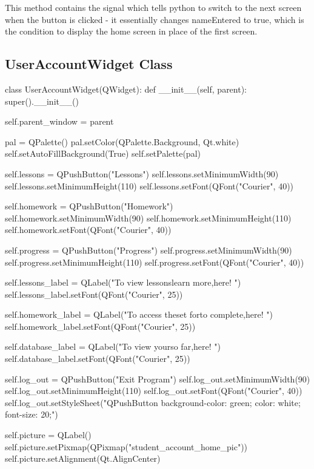 This method contains the signal which tells python to switch to the next screen when the button is clicked - it essentially changes nameEntered to true, which is the condition to display the home screen in place of the first screen.

\subsection{UserAccountWidget Class}

\begin{python}
class UserAccountWidget(QWidget):
    def __init__(self, parent):
        super().__init__()
        
        self.parent_window = parent

        pal = QPalette()
        pal.setColor(QPalette.Background, Qt.white)
        self.setAutoFillBackground(True)
        self.setPalette(pal)

        self.lessons = QPushButton("Lessons")
        self.lessons.setMinimumWidth(90)
        self.lessons.setMinimumHeight(110)
        self.lessons.setFont(QFont("Courier", 40))

        self.homework = QPushButton("Homework")
        self.homework.setMinimumWidth(90)
        self.homework.setMinimumHeight(110)
        self.homework.setFont(QFont("Courier", 40))

        self.progress = QPushButton("Progress")
        self.progress.setMinimumWidth(90)
        self.progress.setMinimumHeight(110)
        self.progress.setFont(QFont("Courier", 40))
        
        self.lessons_label = QLabel("To view lessons\nand learn more,\nclick here! ")
        self.lessons_label.setFont(QFont("Courier", 25))
        
        self.homework_label = QLabel("To access the\nhomework set for\nyou to complete,\nclick here! ")
        self.homework_label.setFont(QFont("Courier", 25))
        
        self.database_label = QLabel("To view your\nprogress so far,\nclick here! ")
        self.database_label.setFont(QFont("Courier", 25))
        
        self.log_out = QPushButton("Exit Program")
        self.log_out.setMinimumWidth(90)
        self.log_out.setMinimumHeight(110)
        self.log_out.setFont(QFont("Courier", 40))
        self.log_out.setStyleSheet("QPushButton {background-color: green; color: white; font-size: 20;}")

        self.picture = QLabel()
        self.picture.setPixmap(QPixmap("student_account_home_pic"))
        self.picture.setAlignment(Qt.AlignCenter)
        

\end{python}
